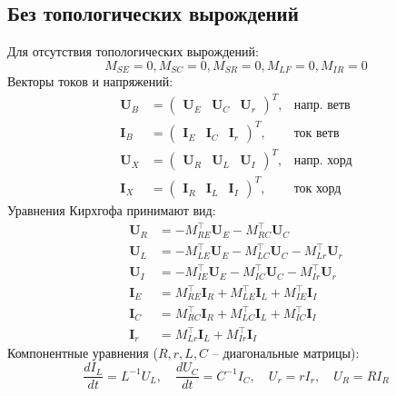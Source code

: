 	\subsection{Без топологических вырождений}
	Для отсутствия топологических вырождений:
	\begin{equation}
			M_{SE} = 0, M_{SC} = 0, M_{SR} = 0, M_{LF} = 0, M_{IR} = 0
	\end{equation}
	Векторы токов и напряжений:
	\begin{equation}
		\begin{aligned}
			\bm{U}_B &= \begin{pmatrix} \bm{U}_E & \bm{U}_C & \bm{U}_r \end{pmatrix}^T, & \text{напр. ветв} \\
			\bm{I}_B &= \begin{pmatrix} \bm{I}_E & \bm{I}_C & \bm{I}_r \end{pmatrix}^T, & \text{ток ветв} \\
			\bm{U}_X &= \begin{pmatrix} \bm{U}_R & \bm{U}_L & \bm{U}_I \end{pmatrix}^T, & \text{напр. хорд} \\
			\bm{I}_X &= \begin{pmatrix} \bm{I}_R & \bm{I}_L & \bm{I}_I \end{pmatrix}^T, & \text{ток хорд}
		\end{aligned}
	\end{equation}
	Уравнения Кирхгофа принимают вид:
	\begin{equation}
		\begin{aligned}
			\bm{U}_R &= -M_{RE}^\top \bm{U}_E - M_{RC}^\top \bm{U}_C \\ 
			\bm{U}_L &= -M_{LE}^\top \bm{U}_E - M_{LC}^\top \bm{U}_C - M_{Lr}^\top \bm{U}_r \\ 
			\bm{U}_I &= -M_{IE}^\top \bm{U}_E - M_{IC}^\top \bm{U}_C - M_{Ir}^\top \bm{U}_r \\ 
			\bm{I}_E &= M_{RE}^\top \bm{I}_R + M_{LE}^\top \bm{I}_L + M_{IE}^\top \bm{I}_I \\ 
			\bm{I}_C &= M_{RC}^\top \bm{I}_R + M_{LC}^\top \bm{I}_L + M_{IC}^\top \bm{I}_I \\ 
			\bm{I}_r &= M_{Lr}^\top \bm{I}_L + M_{Ir}^\top \bm{I}_I
		\end{aligned}
	\end{equation}
	Компонентные уравнения ($R, r, L, C$ – диагональные матрицы):
	\begin{equation}
		\frac{d I_L}{dt} = L^{-1} U_L, \quad \frac{d U_C}{dt} = C^{-1} I_C, \quad U_r = r I_r, \quad U_R = R I_R
	\end{equation}
